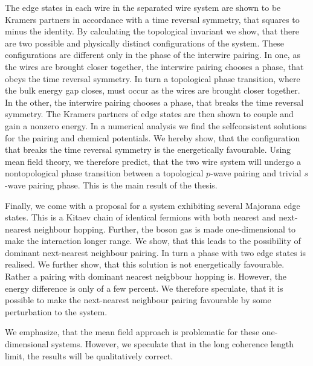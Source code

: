 \documentclass[11pt, twoside]{Thesis}
\begin{document}
The edge states in each wire in the separated wire system are shown to be Kramers partners in accordance with a time reversal symmetry, that squares to minus the identity. By calculating the topological invariant we show, that there are two possible and physically distinct configurations of the system. These configurations are different only in the phase of the interwire pairing. In one, as the wires are brought closer together, the interwire pairing chooses a phase, that obeys the time reversal symmetry. In turn a topological phase transition, where the bulk energy gap closes, must occur as the wires are brought closer together. In the other, the interwire pairing chooses a phase, that breaks the time reversal symmetry. The Kramers partners of edge states are then shown to couple and gain a nonzero energy. In a numerical analysis we find the selfconsistent solutions for the pairing and chemical potentials. We hereby show, that the configuration that breaks the time reversal symmetry is the energetically favourable. Using mean field theory, we therefore predict, that the two wire system will undergo a nontopological phase transition between a topological $p$-wave pairing and trivial $s$-wave pairing phase. This is the main result of the thesis. 

Finally, we come with a proposal for a system exhibiting several Majorana edge states. This is a Kitaev chain of identical fermions with both nearest and next-nearest neighbour hopping. Further, the boson gas is made one-dimensional to make the interaction longer range. We show, that this leads to the possibility of dominant next-nearest neighbour pairing. In turn a phase with two edge states is realised. We further show, that this solution is not energetically favourable. Rather a pairing with dominant nearest neigbbour hopping is. However, the energy difference is only of a few percent. We therefore speculate, that it is possible to make the next-nearest neighbour pairing favourable by some perturbation to the system. 

We emphasize, that the mean field approach is problematic for these one-dimensional systems. However, we speculate that in the long coherence length limit, the results will be qualitatively correct. 
\newpage 

%

\end{document}
